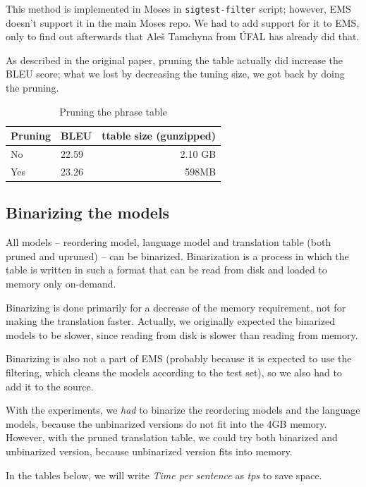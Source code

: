 This method is implemented in Moses in \texttt{sigtest-filter} script; however, EMS doesn't support it in the main Moses repo. We had to add support for it to EMS, only to find out afterwards that Aleš Tamchyna from ÚFAL has already did that.

As described in the original paper, pruning the table actually did increase the BLEU score; what we lost by decreasing the tuning size, we got back by doing the pruning.

\begin{table}[h]
\begin{center}
\begin{tabular}{|l|l|r|}
    \hline
    \textbf{Pruning} & \textbf{BLEU} & \textbf{ttable size (gunzipped)} \\ \hline
    No & 22.59 & 2.10 GB \\ \hline
    Yes & 23.26 & 598MB \\  \hline
\end{tabular}
\end{center}

\caption{Pruning the phrase table}\label{moses:tablepruning}
\end{table}

\subsection{Binarizing the models}
All models -- reordering model, language model and translation table (both pruned and upruned) -- can be binarized. Binarization is a process in which the table is written in such a format that can be read from disk and loaded to memory only on-demand.

Binarizing is done primarily for a decrease of the memory requirement, not for making the translation faster. Actually, we originally expected the binarized models to be slower, since  reading from disk  is slower than reading from memory.

Binarizing is also not a part of EMS (probably because it is expected to use the filtering, which cleans the models according to the test set), so we also had to add it to the source.

With the experiments, we \emph{had} to binarize the reordering models and the language models, because the unbinarized versions do not fit into the 4GB memory. However, with the pruned translation table, we could try both binarized and unbinarized version, because unbinarized version fits into memory.

In the tables below, we will write \emph{Time per sentence} as \emph{tps} to save space.


